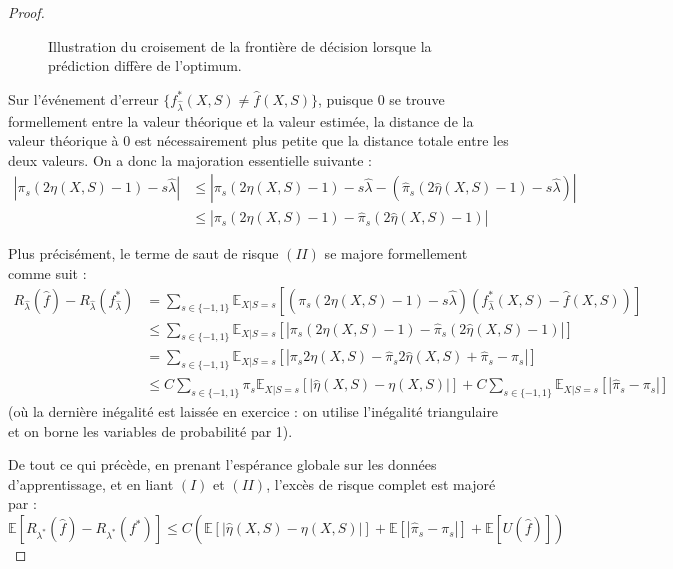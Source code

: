 \begin{proof}
\begin{figure}[h]
        \caption{Illustration du croisement de la frontière de décision lorsque la prédiction diffère de l'optimum.}
        \label{fig:risk_consistency_schema}
    \end{figure}

    Sur l'événement d'erreur $\{ f^*_{\hat{\lambda}}(X, S) \neq \hat{f}(X, S) \}$, puisque $0$ se trouve formellement entre la valeur théorique et la valeur estimée, la distance de la valeur théorique à $0$ est nécessairement plus petite que la distance totale entre les deux valeurs. On a donc la majoration essentielle suivante :
    \begin{align}
        |\pi_s(2\eta(X,S)-1) - s\hat{\lambda}| &\le |\pi_s(2\eta(X,S)-1) - s\hat{\lambda} - (\hat{\pi}_s(2\hat{\eta}(X,S)-1) - s\hat{\lambda})| \nonumber \\
        &\le |\pi_s(2\eta(X,S)-1) - \hat{\pi}_s(2\hat{\eta}(X,S)-1)|
    \end{align}
    
    Plus précisément, le terme de saut de risque $(II)$ se majore formellement comme suit :
    \begin{align}
        R_{\hat{\lambda}}(\hat{f}) - R_{\hat{\lambda}}(f^*_{\hat{\lambda}}) 
        &= \sum_{s \in \{-1, 1\}} \mathbb{E}_{X|S=s} \left[ \left( \pi_s(2\eta(X,S)-1) - s\hat{\lambda} \right) \left( f^*_{\hat{\lambda}}(X,S) - \hat{f}(X,S) \right) \right] \nonumber \\
        &\le \sum_{s \in \{-1, 1\}} \mathbb{E}_{X|S=s} \left[ \left| \pi_s(2\eta(X,S)-1) - \hat{\pi}_s(2\hat{\eta}(X,S)-1) \right| \right] \nonumber \\
        &= \sum_{s \in \{-1, 1\}} \mathbb{E}_{X|S=s} \left[ \left| \pi_s 2\eta(X,S) - \hat{\pi}_s 2\hat{\eta}(X,S) + \hat{\pi}_s - \pi_s \right| \right] \nonumber \\
        &\le C \sum_{s \in \{-1, 1\}} \pi_s \mathbb{E}_{X|S=s} \left[ | \hat{\eta}(X,S) - \eta(X,S) | \right] + C \sum_{s \in \{-1, 1\}} \mathbb{E}_{X|S=s} \left[ | \hat{\pi}_s - \pi_s | \right]
    \end{align}
    (où la dernière inégalité est laissée en exercice : on utilise l'inégalité triangulaire et on borne les variables de probabilité par 1).

    De tout ce qui précède, en prenant l'espérance globale sur les données d'apprentissage, et en liant $(I)$ et $(II)$, l'excès de risque complet est majoré par :
    \begin{equation}
        \mathbb{E} \left[ R_{\lambda^*}(\hat{f}) - R_{\lambda^*}(f^*) \right] \le C \left( \mathbb{E}\left[|\hat{\eta}(X,S) - \eta(X,S)|\right] + \mathbb{E}\left[|\hat{\pi}_s - \pi_s|\right] + \mathbb{E}[U(\hat{f})] \right)
    \end{equation}
    

\end{proof}
